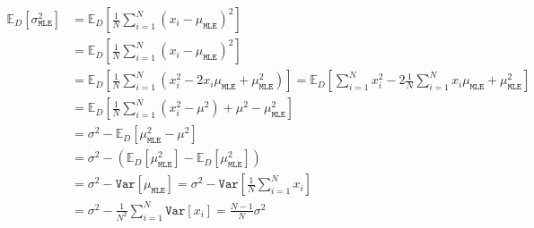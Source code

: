 \begin{align}
	\mathbb{E}_{D}\left[\sigma_{\mathtt{MLE}}^2\right] & = \mathbb{E}_{D}\left[\frac{1}{N} \sum_{i=1}^{N} \left(x_i - \mu_{\mathtt{MLE}}\right)^2\right]                                                                                                                                                             \\
	                                                   & = \mathbb{E}_{D}\left[\frac{1}{N} \sum_{i=1}^{N}  \left(x_i - \mu_{\mathtt{MLE}}\right)^2\right]                                                                                                                                                            \\
	                                                   & = \mathbb{E}_{D}\left[\frac{1}{N} \sum_{i=1}^{N}  \left(x_i^2 - 2x_i \mu_{\mathtt{MLE}} + \mu_{\mathtt{MLE}}^2\right) \right] =  \mathbb{E}_{D}\left[\sum_{i=1}^{N} x_i^2 - 2 \frac{1}{N}\sum_{i=1}^{N}x_i \mu_{\mathtt{MLE}} + \mu_{\mathtt{MLE}}^2\right] \\
	                                                   & = \mathbb{E}_{D}\left[\frac{1}{N}\sum_{i=1}^{N} \left(x_i^2 - \mu^2\right) + \mu^2 - \mu_{\mathtt{MLE}}^2 \right]                                                                                                                                           \\
	                                                   & = \sigma^2 - \mathbb{E}_{D} \left[ \mu_{\mathtt{MLE}}^2 - \mu^2\right]                                                                                                                                                                                      \\
	                                                   & = \sigma^2 -  \left(\mathbb{E}_{D} \left[\mu_{\mathtt{MLE}}^2\right] - \mathbb{E}_{D} \left[\mu_{\mathtt{MLE}}^2\right] \right)                                                                                                                             \\
	                                                   & = \sigma^2 -  \mathtt{Var}\left[\mu_{\mathtt{MLE}}\right]  =  \sigma^2 - \mathtt{Var}\left[\frac{1}{N} \sum_{i=1}^N x_i \right]                                                                                                                             \\
	                                                   & = \sigma^2 - \frac{1}{N^2} \sum_{i=1}^N \mathtt{Var}\left[x_i\right] = \frac{N-1}{N} \sigma^2                                                                                                                                                               \\
\end{align}


